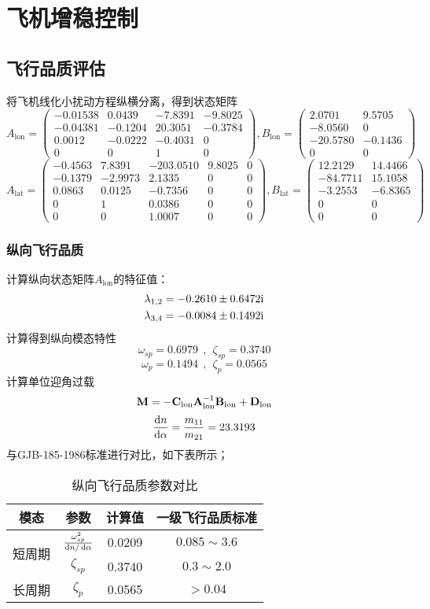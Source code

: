 \section{飞机增稳控制}
\subsection{飞行品质评估}
将飞机线化小扰动方程纵横分离，得到状态矩阵
$$
A_{\text{lon}}=
\begin{pmatrix}
-0.01538&0.0439&-7.8391&-9.8025\\
-0.04381&-0.1204&20.3051&-0.3784\\
0.0012&-0.0222&-0.4031&0\\
0&0&1&0
\end{pmatrix}
,
B_{\text{lon}}=
\begin{pmatrix}
2.0701&9.5705\\
-8.0560&0\\
-20.5780&-0.1436\\
0&0
\end{pmatrix}
$$
$$
A_{\text{lat}}=
\begin{pmatrix}
-0.4563&7.8391&-203.0510&9.8025&0\\
-0.1379&-2.9973&2.1335&0&0\\
0.0863&0.0125&-0.7356&0&0\\
0&1&0.0386&0&0\\
0&0&1.0007&0&0
\end{pmatrix}
,
B_{\text{lat}}=
\begin{pmatrix}
12.2129&14.4466\\
-84.7711&15.1058\\
-3.2553&-6.8365\\
0&0\\
0&0
\end{pmatrix}
$$
\subsubsection{纵向飞行品质}
计算纵向状态矩阵$A_{\text{lon}}$的特征值：
$$
\begin{aligned}
\lambda_{1,2}&=-0.2610\pm 0.6472{\mathrm i}\\
\lambda_{3,4}&=-0.0084\pm 0.1492{\mathrm i}
\end{aligned}
$$
计算得到纵向模态特性
$$
\omega_{sp}=0.6979\ \ ,\ \ \zeta_{sp}=0.3740
$$
$$
\omega_{p}=0.1494\ \ ,\ \ \zeta_{p}=0.0565
$$
计算单位迎角过载
$$
{\mathbf M}=-{\mathbf C}_{\text{lon}}{\mathbf A}_{\text{lon}}^{-1}{\mathbf B}_{\text{lon}}+{\mathbf D}_{\text{lon}}
$$
$$
\frac{\operatorname{d\!} n}{\operatorname{d\!}\alpha}=\frac{m_{11}}{m_{21}}=23.3193
$$
与GJB-185-1986标准进行对比，如下表所示；
\begin{table}[!h]
\centering
\caption{纵向飞行品质参数对比}
\begin{tabular}{@{}cccc@{}}
\toprule
模态&参数 & 计算值 & 一级飞行品质标准 \\ \midrule
\multirow{2}{*}{短周期}&$\frac{\omega_{sp}^2}{\operatorname{d\!} n/\operatorname{d\!} \alpha}$ & 0.0209 & $0.085\sim3.6$ \\
&$\zeta_{sp}$ & 0.3740 & $0.3\sim2.0$ \\ \midrule
长周期&$\zeta_p$ & 0.0565 & $>0.04$ \\ \bottomrule
\end{tabular}
\end{table}

